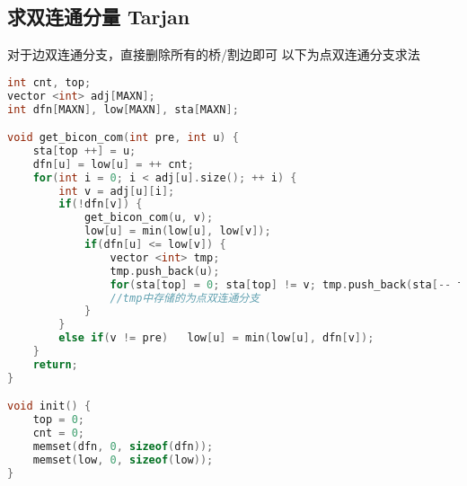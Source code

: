 \subsection{求双连通分量 Tarjan}
对于边双连通分支，直接删除所有的桥/割边即可
以下为点双连通分支求法
    \begin{lstlisting}[language=c++]
int cnt, top;
vector <int> adj[MAXN];
int dfn[MAXN], low[MAXN], sta[MAXN];

void get_bicon_com(int pre, int u) {
    sta[top ++] = u;
    dfn[u] = low[u] = ++ cnt;
    for(int i = 0; i < adj[u].size(); ++ i) {
        int v = adj[u][i];
        if(!dfn[v]) {
            get_bicon_com(u, v);
            low[u] = min(low[u], low[v]);
            if(dfn[u] <= low[v]) {
                vector <int> tmp;
                tmp.push_back(u);
                for(sta[top] = 0; sta[top] != v; tmp.push_back(sta[-- top]));
                //tmp中存储的为点双连通分支
            }
        }
        else if(v != pre)   low[u] = min(low[u], dfn[v]);
    }
    return;
}

void init() {
    top = 0;
    cnt = 0;
    memset(dfn, 0, sizeof(dfn));
    memset(low, 0, sizeof(low));
}
    \end{lstlisting}
